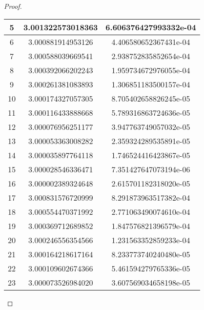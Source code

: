 \begin{enumerate}
\begin{proof}
\begin{table}[htbp]
\begin{subtable}[t]{.49\linewidth}
\begin{tabular}{|c|c|c|}
			\footnotesize	5	&	\footnotesize	3.001322573018363	&	\footnotesize	6.606376427993332e-04	\\	\hline
			\footnotesize	6	&	\footnotesize	3.000881914953126	&	\footnotesize	4.406580652367431e-04	\\	\hline
			\footnotesize	7	&	\footnotesize	3.000588039669541	&	\footnotesize	2.938752835852654e-04	\\	\hline
			\footnotesize	8	&	\footnotesize	3.000392066202243	&	\footnotesize	1.959734672976055e-04	\\	\hline
			\footnotesize	9	&	\footnotesize	3.000261381083893	&	\footnotesize	1.306851183500157e-04	\\	\hline
			\footnotesize	10	&	\footnotesize	3.000174327057305	&	\footnotesize	8.705402658826245e-05	\\	\hline
			\footnotesize	11	&	\footnotesize	3.000116433888668	&	\footnotesize	5.789316863724636e-05	\\	\hline
			\footnotesize	12	&	\footnotesize	3.000076956251177	&	\footnotesize	3.947763749057032e-05	\\	\hline
			\footnotesize	13	&	\footnotesize	3.000053363008282	&	\footnotesize	2.359324289535891e-05	\\	\hline
			\footnotesize	14	&	\footnotesize	3.000035897764118	&	\footnotesize	1.746524416423867e-05	\\	\hline
			\footnotesize	15	&	\footnotesize	3.000028546336471	&	\footnotesize	7.351427647073194e-06	\\	\hline
			\footnotesize	16	&	\footnotesize	3.000002389324648	&	\footnotesize	2.615701182318020e-05	\\	\hline
			\footnotesize	17	&	\footnotesize	3.000831576720999	&	\footnotesize	8.291873963517382e-04	\\	\hline
			\footnotesize	18	&	\footnotesize	3.000554470371992	&	\footnotesize	2.771063490074610e-04	\\	\hline
			\footnotesize	19	&	\footnotesize	3.000369712689852	&	\footnotesize	1.847576821396579e-04	\\	\hline
			\footnotesize	20	&	\footnotesize	3.000246556354566	&	\footnotesize	1.231563352859233e-04	\\	\hline
			\footnotesize	21	&	\footnotesize	3.000164218617164	&	\footnotesize	8.233773740240480e-05	\\	\hline
			\footnotesize	22	&	\footnotesize	3.000109602674366	&	\footnotesize	5.461594279765336e-05	\\	\hline
			\footnotesize	23	&	\footnotesize	3.000073526984020	&	\footnotesize	3.607569034658198e-05	\\	\hline

\end{tabular}
\end{subtable}
\end{table}
\end{proof}
\end{enumerate}
